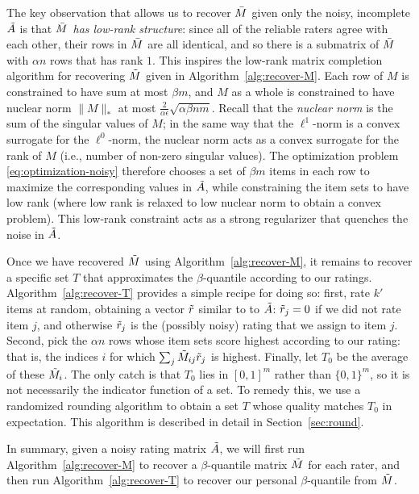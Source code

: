 The key observation that allows us to recover $\bar{M}$ given only the noisy, 
incomplete $\tilde{A}$ is that \emph{$\bar{M}$ has low-rank structure}: since all 
of the reliable raters agree with each other, their rows in $\bar{M}$ are all 
identical, and so there is a submatrix of $\bar{M}$ with $\alpha n$ rows that has 
rank $1$. This inspires the low-rank matrix completion algorithm for recovering 
$\tilde{M}$ given in Algorithm~\ref{alg:recover-M}. Each row of $M$ is constrained 
to have sum at most $\beta m$, and $M$ as a whole is constrained to have 
nuclear norm $\|M\|_*$ at most $\frac{2}{\alpha \epsilon}\sqrt{\alpha\beta nm}$. 
Recall that the \emph{nuclear norm} is the sum of the singular values of 
$M$; in the same way that the $\ell^1$-norm is a convex surrogate for the 
$\ell^0$-norm, the nuclear norm acts as a convex surrogate for the rank of $M$ 
(i.e., number of non-zero singular values). The optimization problem 
\eqref{eq:optimization-noisy} therefore chooses a set of $\beta m$ items in each 
row to maximize the corresponding values in $\tilde{A}$, while constraining the item 
sets to have low rank (where low rank is relaxed to low nuclear norm to obtain 
a convex problem). 
This low-rank constraint acts as a strong regularizer that quenches the noise 
in $\tilde{A}$.



Once we have recovered $\tilde{M}$ using Algorithm~\ref{alg:recover-M}, it remains to 
recover a specific set $T$ that approximates the $\beta$-quantile according to 
our ratings. Algorithm~\ref{alg:recover-T} provides a simple recipe for doing so: 
first, rate $k'$ items at random, obtaining a vector $\tilde{r}$ similar to to 
$\tilde{A}$: $\tilde{r}_j = 0$ if we did not rate item $j$, and otherwise $\tilde{r}_j$ is 
the (possibly noisy) rating that we assign to item $j$. Second, pick the 
$\alpha n$ rows whose item sets score highest according to our rating: that is, 
the indices $i$ for which $\sum_j \tilde{M}_{ij}\tilde{r}_j$ is highest. Finally, let 
$T_0$ be the average of these $\tilde{M}_i$. The only catch is that $T_0$ lies in 
$[0,1]^m$ rather than $\{0,1\}^m$, so it is not necessarily the indicator 
function of a set. To remedy this, we use a randomized rounding algorithm to 
obtain a set $T$ whose quality matches $T_0$ in expectation. This algorithm 
is described in detail in Section~\ref{sec:round}.

In summary, given a noisy rating matrix $\tilde{A}$, we will first run 
Algorithm~\ref{alg:recover-M} to recover a $\beta$-quantile matrix $\tilde{M}$ for 
each rater, and then run Algorithm~\ref{alg:recover-T} to recover our 
personal $\beta$-quantile from $\tilde{M}$.

